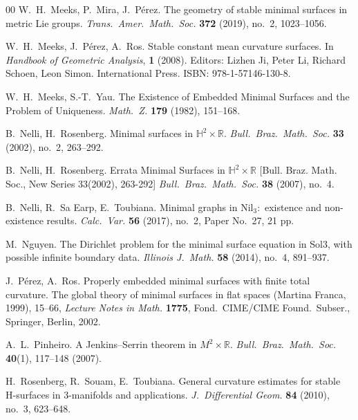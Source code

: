 \documentclass[a4paper,10pt,reqno]{amsart}
\newcommand{\R}{\mathbb{R}}
\theoremstyle{definition}
\theoremstyle{remark}
\numberwithin{equation}{section}
\begin{document}
\begin{thebibliography}{00}
	 W.\ H.\ Meeks, P.\ Mira, J.\ P\'{e}rez.
	\newblock The geometry of stable minimal surfaces in metric Lie groups.
	\newblock \emph{Trans.\ Amer.\ Math.\ Soc.} \textbf{372} (2019), no.\ 2, 1023--1056.

		W.\ H.\ Meeks, J.\ P\'{e}rez, A.\ Ros.
	\newblock Stable constant mean curvature surfaces.
	\newblock In \emph{Handbook of Geometric Analysis}, \textbf{1} (2008). Editors: Lizhen Ji, Peter Li, Richard Schoen, Leon Simon. International Press. ISBN: 978-1-57146-130-8.
		
	 W.\ H.\ Meeks, S.-T.\ Yau.
	\newblock The Existence of Embedded Minimal Surfaces and the Problem of Uniqueness.
	\newblock \emph{Math.\ Z.} \textbf{179} (1982), 151--168.
		
	 B.\ Nelli, H.\ Rosenberg.
	\newblock Minimal surfaces in $\mathbb{H}^2\times\R$.
	\newblock \emph{Bull.\ Braz.\ Math.\ Soc.} \textbf{33} (2002), no.\ 2, 263--292.
		
	B.\ Nelli, H.\ Rosenberg.
	\newblock  Errata Minimal Surfaces in $\mathbb{H}^2\times\mathbb{R}$ [Bull. Braz. Math. Soc., New Series 33(2002), 263-292] 
	\newblock \emph{Bull.\ Braz.\ Math.\ Soc.} \textbf{38} (2007), no.\ 4.

	 B.\ Nelli, R.\ Sa Earp, E.\ Toubiana.
	\newblock Minimal graphs in $\mathrm{Nil}_3$:\ existence and non-existence results. 
	\newblock \emph{Calc.\ Var.} \textbf{56} (2017), no.\ 2, Paper No.\ 27, 21 pp.
		
	 M.\ Nguyen. 
	\newblock The Dirichlet problem for the minimal surface equation in Sol3, with possible infinite boundary data.
	\newblock \emph{Illinois J.\ Math.} \textbf{58} (2014), no.\ 4, 891--937. 

	 J.\ Pérez, A.\ Ros.
	\newblock Properly embedded minimal surfaces with finite total curvature.
	\newblock The global theory of minimal surfaces in flat spaces (Martina Franca, 1999), 15--66, \emph{Lecture Notes in Math.} \textbf{1775}, Fond.\ CIME/CIME Found.\ Subser., Springer, Berlin, 2002.
		
	 A.\ L.\ Pinheiro.
	\newblock A Jenkins--Serrin theorem in $M^2\times\R$.
	\newblock \emph{Bull.\ Braz.\ Math.\ Soc.} {\bf 40}(1), 117--148 (2007).
		
		
	 H.\ Rosenberg, R.\ Souam, E.\ Toubiana.
	\newblock General curvature estimates for stable H-surfaces in 3-manifolds and applications.
	\newblock \emph{J.\ Differential Geom.} \textbf{84} (2010), no.\ 3, 623--648.
				

\end{thebibliography}
\end{document}
